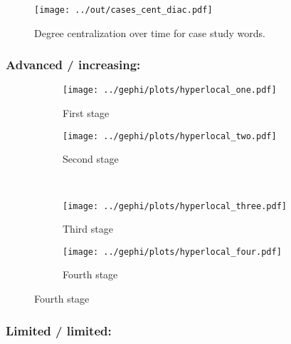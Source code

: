 \documentclass[a4paper, abstract=on]{scrartcl}
\begin{document}
      \begin{figure}[H]
        \caption{Degree centralization over time for case study words.}
        \centering
        \texttt{[image: ../out/cases\_cent\_diac.pdf]}
      \end{figure}

    \subsubsection{Advanced / increasing: }

      \begin{figure}[H]
        \caption{Social network of diffusion for  over time.}
        \centering
        \begin{subfigure}{.45\linewidth}
          \caption{First stage}
          \centering
          \texttt{[image: ../gephi/plots/hyperlocal\_one.pdf]}
        \end{subfigure}
        \begin{subfigure}{.45\linewidth}
          \caption{Second stage}
          \centering
          \texttt{[image: ../gephi/plots/hyperlocal\_two.pdf]}
        \end{subfigure}\\
        \begin{subfigure}{.45\linewidth}
          \caption{Third stage}
          \centering
          \texttt{[image: ../gephi/plots/hyperlocal\_three.pdf]}
        \end{subfigure}
        \begin{subfigure}{.45\linewidth}
          \caption{Fourth stage}
          \centering
          \texttt{[image: ../gephi/plots/hyperlocal\_four.pdf]}
        \end{subfigure}
      \end{figure}

    \subsubsection{Limited / limited: }
\end{document}
